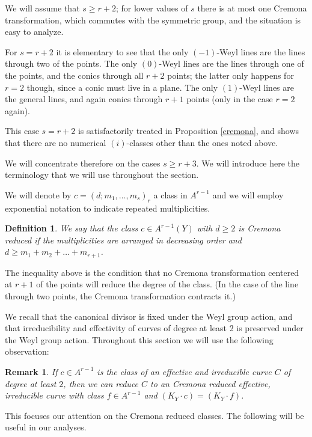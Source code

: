 \documentclass[12pt]{article}
\newtheorem{definition}[equation]{Definition}
\newtheorem{remark}[equation]{Remark}
\numberwithin{equation}{section}
\numberwithin{subeq}{equation}
\begin{document}
We will assume that $s \geq r+2$;
for lower values of $s$ there is at most one Cremona transformation,
which commutes with the symmetric group,
and the situation is easy to analyze.

For $s=r+2$ it is elementary to see that
the only $(-1)$-Weyl lines are the lines through two of the points.
The only $(0)$-Weyl lines are the lines through one of the points,
and the conics through all $r+2$ points;
the latter only happens for $r=2$ though, since a conic must live in a plane.
The only $(1)$-Weyl lines are the general lines,
and again conics through $r+1$ points (only in the case $r=2$ again).

This case $s=r+2$ is satisfactorily treated in Proposition \ref{cremona},
and shows that there are no numerical $(i)$-classes other than the ones noted above.



We will concentrate therefore on the cases $s \geq r+3$. We  will introduce here the terminology that we will use throughout the section.

We will denote by $c=(d;m_1,\ldots,m_s)_r$ a class in $A^{r-1}$
and we will employ exponential notation to indicate repeated multiplicities.



\begin{definition} We say that the class $c \in  A^{r-1}(Y)$ with $d \geq 2$ 
is \emph{Cremona reduced} if 
the multiplicities are arranged in decreasing order and
$d \geq m_1 + m_2 + \dots + m_{r+1}$.
\end{definition}

The inequality above is the condition that
no Cremona transformation centered at $r+1$ of the points
will reduce the degree of the class.
(In the case of the line through two points, the Cremona transformation contracts it.)

We recall that the canonical divisor is fixed under the Weyl group action,
and that irreducibility and effectivity of curves of degree at least 2
is preserved under the Weyl group action.
Throughout this section we will use the following observation:
\begin{remark}\label{reduced}
If  $c\in A^{r-1}$ is the class of
an effective and irreducible curve $C$ of degree at least $2$, 
then we can reduce $C$ to an Cremona reduced effective, irreducible curve
with class $f\in A^{r-1}$  and $(K_Y \cdot c) =(K_Y \cdot f)$.
\end{remark}

This focuses our attention on the Cremona reduced classes.
The following will be useful in our analyses.
\end{document}

